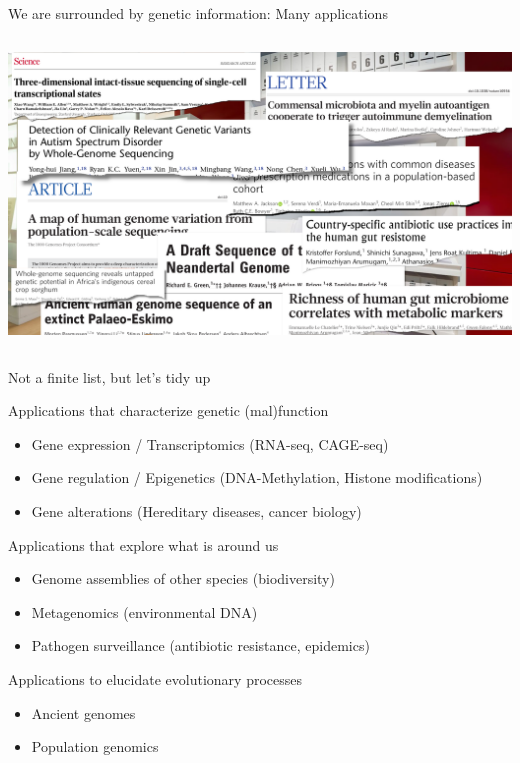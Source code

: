 \documentclass[10pt]{beamer}
\begin{document}
\begin{frame}{We are surrounded by genetic information: Many applications}
	\begin{columns}[T]
		\column{\dimexpr\paperwidth-10pt}
		\includegraphics[width=\textwidth]{./figures/WellcomeCollectionGenomePapers.png}
	\end{columns}
\end{frame}

\begin{frame}{Not a finite list, but let's tidy up}
	\begin{exampleblock}{Applications that characterize genetic (mal)function}
		\begin{itemize}
			\item Gene expression / Transcriptomics (RNA-seq, CAGE-seq)
			\item Gene regulation / Epigenetics (DNA-Methylation, Histone modifications)
			\item Gene alterations (Hereditary diseases, cancer biology)
		\end{itemize}
	\end{exampleblock}
	\begin{exampleblock}{Applications that explore what is around us}
		\begin{itemize}
			\item Genome assemblies of other species (biodiversity)
			\item Metagenomics (environmental DNA)
			\item Pathogen surveillance (antibiotic resistance, epidemics)
		\end{itemize}
	\end{exampleblock}
	\begin{exampleblock}{Applications to elucidate evolutionary processes}
	\begin{itemize}
		\item Ancient genomes
		\item Population genomics
	\end{itemize}
\end{exampleblock}
\end{frame}
\end{document}
